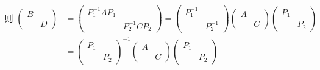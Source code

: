          \(
         \begin{aligned}
             \text{则 }\begin{pmatrix}
                          B &   \\
                            & D
                      \end{pmatrix}
              & = \begin{pmatrix}
                      P_{1}^{-1}AP_{1} &                  \\
                                       & P_{2}^{-1}CP_{2}
                  \end{pmatrix} = \begin{pmatrix}
                                      P_{1}^{-1} &            \\
                                                 & P_{2}^{-1}
                                  \end{pmatrix}\begin{pmatrix}
                                                   A &   \\
                                                     & C
                                               \end{pmatrix}\begin{pmatrix}
                                                                P_{1} &       \\
                                                                      & P_{2}
                                                            \end{pmatrix} \\
              & = \begin{pmatrix}
                      P_{1} &       \\
                            & P_{2}
                  \end{pmatrix}^{-1}\begin{pmatrix}
                                        A &   \\
                                          & C
                                    \end{pmatrix}\begin{pmatrix}
                                                     P_{1} &       \\
                                                           & P_{2}
                                                 \end{pmatrix}
         \end{aligned} \)

